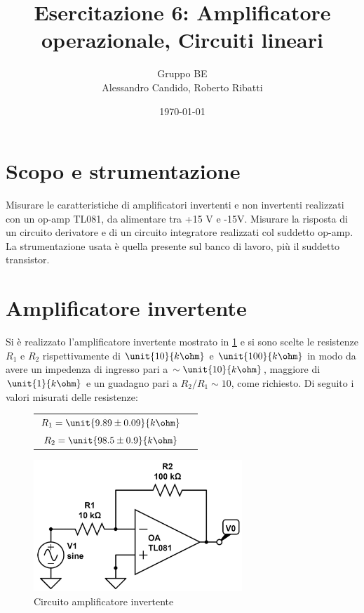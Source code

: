 \documentclass[10pt,a4paper]{article}
\title{Esercitazione 6: Amplificatore operazionale, Circuiti lineari}
\author{Gruppo BE \\ Alessandro Candido, Roberto Ribatti}
\date{\today}
\begin{document}
\maketitle

\section{Scopo e strumentazione}
Misurare le caratteristiche di amplificatori invertenti e non invertenti realizzati con un op-amp TL081, da alimentare tra +15 V e -15V. Misurare la risposta di un circuito derivatore e di un circuito integratore realizzati col suddetto op-amp.
La strumentazione usata è quella presente sul banco di lavoro, più il suddetto transistor.

\section{Amplificatore invertente}
Si è realizzato l'amplificatore invertente mostrato in \figurename{\ref{circuito_amp_inv}} e si sono scelte le resistenze $R_1$ e $R_2$ rispettivamente di $\unit{10}{k\ohm}$ e $\unit{100}{k\ohm}$ in modo da avere un impedenza di ingresso pari a $\sim \unit{10}{k\ohm}$, maggiore di $\unit{1}{k\ohm}$ e un guadagno pari a $R_2/R_1 \sim 10$, come richiesto. Di seguito i valori misurati delle resistenze:
\begin{figure}[H]
\begin{minipage}{0.49\textwidth}
	\centering
	\begin{tabular}{cc}
		$R_1 = \unit{9.89 \pm 0.09}{k\ohm}$  \\ $R_2 = \unit{98.5 \pm 0.9}{k\ohm}$
	\end{tabular}
\end{minipage}
\begin{minipage}{0.49\textwidth}
	\centering
	\includegraphics[width=0.7\textwidth]{../grafici/inv_amp_circuito.jpg}
	\caption{Circuito amplificatore invertente}
	\label{circuito_amp_inv}
\end{minipage}
\end{figure}
\end{document}
